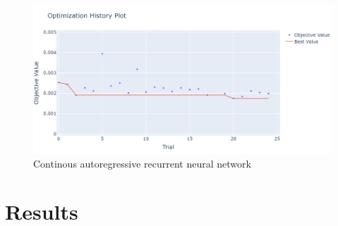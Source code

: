 \documentclass[11pt,table]{article}
\begin{document}
\begin{figure}[H]
	\centering
	\includegraphics[scale=1]{Figures/optimHistory.png}
	\caption{Continous autoregressive recurrent neural network}
	\label{fig:continousARNN}
\end{figure}

\section{Results}
\end{document}
